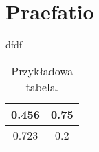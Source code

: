 \newpage %
\section{Praefatio}
dfdf



\begin{table}[!h] \label{tab:tabela1} \centering
    \caption{Przykładowa tabela.}
    \begin{tabular} {| c | c |} \hline
        0.456 & 0.75 \\ \hline
        0.723 & 0.2  \\ \hline
    \end{tabular}
\end{table}